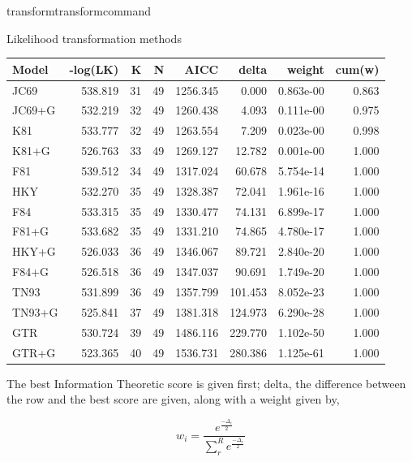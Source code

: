 \begin{command}{transform}{transformcommand}
\begin{arguments}
\begin{argumentgroup}{Likelihood transformation methods}
{                \begin{center}
                    \begin{tabular}{ l r r r | r r r || r }
                    Model &-log(LK)&K& N& AICC   & delta &weight   &cum(w)\\
                    \hline
                    JC69  &538.819&31&49&1256.345&  0.000&0.863e-00&0.863 \\
                    JC69+G&532.219&32&49&1260.438&  4.093&0.111e-00&0.975 \\
                    K81   &533.777&32&49&1263.554&  7.209&0.023e-00&0.998 \\
                    K81+G &526.763&33&49&1269.127& 12.782&0.001e-00&1.000 \\
                    F81   &539.512&34&49&1317.024& 60.678&5.754e-14&1.000 \\
                    HKY   &532.270&35&49&1328.387& 72.041&1.961e-16&1.000 \\
                    F84   &533.315&35&49&1330.477& 74.131&6.899e-17&1.000 \\
                    F81+G &533.682&35&49&1331.210& 74.865&4.780e-17&1.000 \\
                    HKY+G &526.033&36&49&1346.067& 89.721&2.840e-20&1.000 \\
                    F84+G &526.518&36&49&1347.037& 90.691&1.749e-20&1.000 \\
                    TN93  &531.899&36&49&1357.799&101.453&8.052e-23&1.000 \\
                    TN93+G&525.841&37&49&1381.318&124.973&6.290e-28&1.000 \\
                    GTR   &530.724&39&49&1486.116&229.770&1.102e-50&1.000 \\
                    GTR+G &523.365&40&49&1536.731&280.386&1.125e-61&1.000 \\
                    \end{tabular}
                \end{center}

                The best Information Theoretic score is given first; delta, the
                difference between the row and the best score are given, along
                with a weight given by,

                    \begin{equation*}
                        w_{i} = \frac{e^{\frac{-\Delta_i}{2}}}
                                     {\sum^R_r e^{\frac{-\Delta_r}{2}}}
                    \end{equation*}

}
\end{argumentgroup}
\end{arguments}
\end{command}
